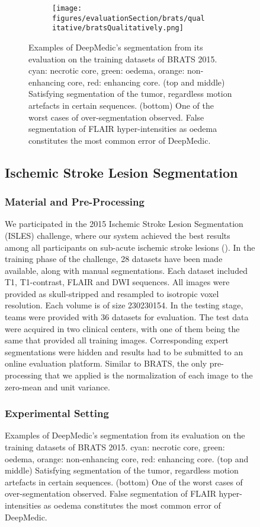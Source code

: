 \documentclass[preprint,authoryear,12pt]{elsarticle}
\begin{document}
\begin{figure}[h]
\begin{figure}[!h]
\centering
\begin{subfigure}[b]{1.0\textwidth}
	\centering
	\texttt{[image: figures/evaluationSection/brats/qualitative/bratsQualitatively.png]}
\end{subfigure}
\vspace{-0pt} \caption{Examples of DeepMedic's segmentation from its evaluation on the training datasets of BRATS 2015. cyan: necrotic core, green: oedema, orange: non-enhancing core, red: enhancing core. (top and middle) Satisfying segmentation of the tumor, regardless motion artefacts in certain sequences. (bottom) One of the worst cases of over-segmentation observed. False segmentation of FLAIR hyper-intensities as oedema constitutes the most common error of DeepMedic.}
\label{fig:evalBratsVisualQuality}
\end{figure}
%
 


\subsection{Ischemic Stroke Lesion Segmentation}
\label{subsec:evalIsles}

\subsubsection{Material and Pre-Processing}

We participated in the 2015 Ischemic Stroke Lesion Segmentation (ISLES) challenge, where our system achieved the best results among all participants on sub-acute ischemic stroke lesions (\cite{maier2017isles}). In the training phase of the challenge, 28 datasets have been made available, along with manual segmentations. Each dataset included T1, T1-contrast, FLAIR and DWI sequences. All images were provided as skull-stripped and resampled to isotropic  voxel resolution. Each volume is of size 230230154. In the testing stage, teams were provided with 36 datasets for evaluation. The test data were acquired in two clinical centers, with one of them being the same that provided all training images. Corresponding expert segmentations were hidden and results had to be submitted to an online evaluation platform. Similar to BRATS, the only pre-processing that we applied is the normalization of each image to the zero-mean and unit variance.

\subsubsection{Experimental Setting}


\end{figure}
\end{document}
